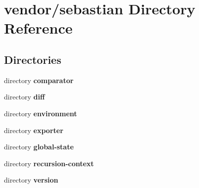 \section{vendor/sebastian Directory Reference}
\label{dir_d72df0131555b764a31e2fc31fd1127e}
\subsection*{Directories}
\begin{DoxyCompactItemize}
\item 
directory {\bf comparator}
\item 
directory {\bf diff}
\item 
directory {\bf environment}
\item 
directory {\bf exporter}
\item 
directory {\bf global-\/state}
\item 
directory {\bf recursion-\/context}
\item 
directory {\bf version}
\end{DoxyCompactItemize}

